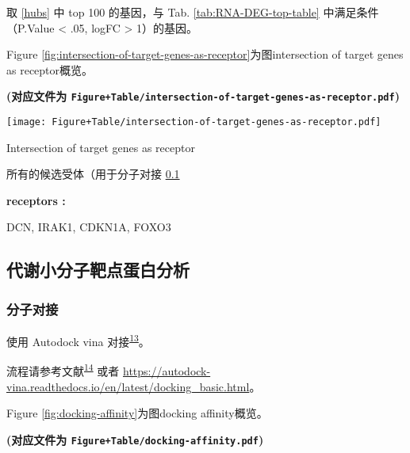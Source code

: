 \documentclass[
]{article}
\begin{document}
取 \ref{hubs} 中 top 100 的基因，与 Tab. \ref{tab:RNA-DEG-top-table} 中满足条件（P.Value \textless{} .05, \textbar logFC\textbar{} \textgreater{} 1）的基因。

Figure \ref{fig:intersection-of-target-genes-as-receptor}为图intersection of target genes as receptor概览。

\textbf{(对应文件为 \texttt{Figure+Table/intersection-of-target-genes-as-receptor.pdf})}

\def\@captype{figure}
\begin{center}
\texttt{[image: Figure+Table/intersection-of-target-genes-as-receptor.pdf]}
\caption{Intersection of target genes as receptor}\label{fig:intersection-of-target-genes-as-receptor}
\end{center}

所有的候选受体（用于分子对接 \ref{dock1}

\begin{center}\begin{tcolorbox}[colback=gray!10, colframe=gray!50, width=0.9\linewidth, arc=1mm, boxrule=0.5pt]
\textbf{
receptors
:}

\vspace{0.5em}

    DCN, IRAK1, CDKN1A, FOXO3

\vspace{2em}
\end{tcolorbox}
\end{center}

\hypertarget{dock1}{%
\subsection{代谢小分子靶点蛋白分析}\label{dock1}}

\hypertarget{ux5206ux5b50ux5bf9ux63a5}{%
\subsubsection{分子对接}\label{ux5206ux5b50ux5bf9ux63a5}}

使用 Autodock vina 对接\textsuperscript{\protect\hyperlink{ref-AutodockVina1Eberha2021}{13}}。

流程请参考文献\textsuperscript{\protect\hyperlink{ref-ComputationalPForli2016}{14}} 或者 \url{https://autodock-vina.readthedocs.io/en/latest/docking_basic.html}。

Figure \ref{fig:docking-affinity}为图docking affinity概览。

\textbf{(对应文件为 \texttt{Figure+Table/docking-affinity.pdf})}
\end{document}
